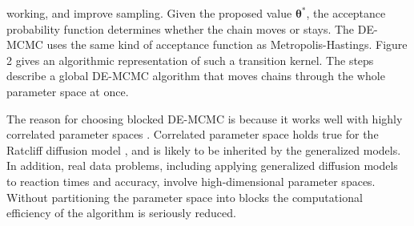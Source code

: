 \documentclass[12pt]{article}
\begin{document}

\vspace{5mm}

\noindent working, and improve sampling. Given the proposed value $\boldsymbol{\theta}^*$, the acceptance probability function determines whether the chain moves or stays. The DE-MCMC uses the same kind of acceptance function as Metropolis-Hastings. Figure 2 gives an algorithmic representation of such a transition kernel. The steps describe a global DE-MCMC algorithm that moves chains through the whole parameter space at once.

	The reason for choosing blocked DE-MCMC is because it works well with highly correlated parameter spaces \citep{TurSed2013}. Correlated parameter space holds true for the Ratcliff diffusion model \citep{RatTue2002}, and is likely to be inherited by the generalized models. In addition, real data problems, including applying generalized diffusion models to reaction times and accuracy, involve high-dimensional parameter spaces. Without partitioning the parameter space into blocks the computational efficiency of the algorithm is seriously reduced. 
    
\end{document}
